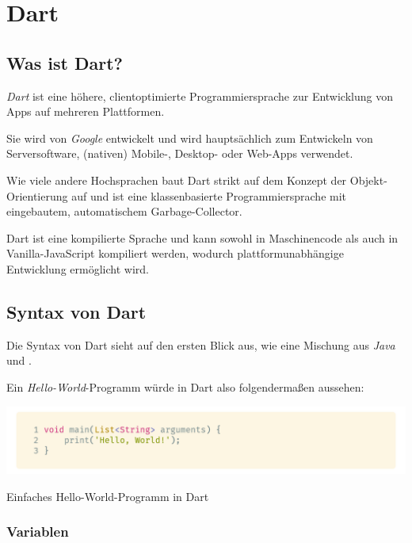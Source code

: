 \section{Dart}
\label{dart}

\subsection{Was ist Dart?}

\textit{Dart} ist eine höhere, clientoptimierte Programmiersprache zur Entwicklung von Apps auf mehreren Plattformen.

Sie wird von \textit{Google} entwickelt und wird hauptsächlich zum Entwickeln von Serversoftware, (nativen) Mobile-, Desktop- oder Web-Apps verwendet.

Wie viele andere Hochsprachen baut Dart strikt auf dem Konzept der Objekt-Orientierung auf und ist eine klassenbasierte Programmiersprache mit eingebautem, automatischem
Garbage-Collector.

Dart ist eine kompilierte Sprache und kann sowohl in Maschinencode als auch in Vanilla-JavaScript kompiliert werden, wodurch plattformunabhängige Entwicklung ermöglicht 
wird.~\cite{dartoverview2021}

\subsection{Syntax von Dart}

Die Syntax von Dart sieht auf den ersten Blick aus, wie eine Mischung aus \textit{Java} und .

Ein \textit{Hello-World}-Programm würde in Dart also folgendermaßen aussehen:

\begin{code}[h]
    \centering
    \includegraphics[width=1\textwidth]{images/Dart/theory/dartHelloWorld.png}
    \vspace{-25pt}
    \caption{Einfaches Hello-World-Programm in Dart}
\end{code}

\subsubsection{Variablen}

